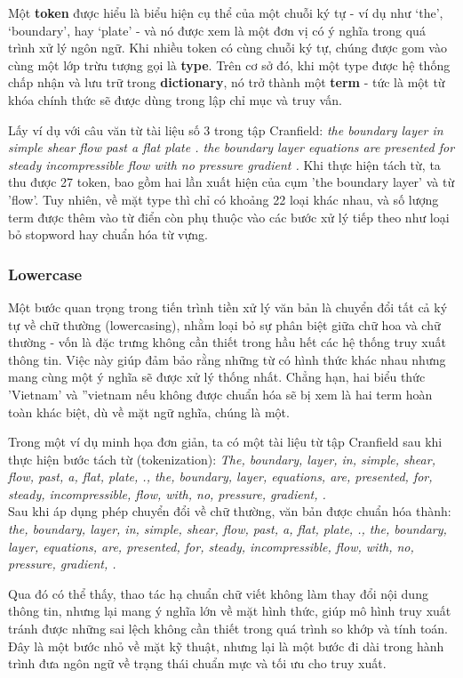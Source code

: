 Một \textbf{token} được hiểu là biểu hiện cụ thể của một chuỗi ký tự - ví dụ như `the', `boundary', hay `plate' - và nó được xem là một đơn vị có ý nghĩa trong quá trình xử lý ngôn ngữ. Khi nhiều token có cùng chuỗi ký tự, chúng được gom vào cùng một lớp trừu tượng gọi là \textbf{type}. Trên cơ sở đó, khi một type được hệ thống chấp nhận và lưu trữ trong \textbf{dictionary}, nó trở thành một \textbf{term} - tức là một từ khóa chính thức sẽ được dùng trong lập chỉ mục và truy vấn.

Lấy ví dụ với câu văn từ tài liệu số 3 trong tập Cranfield:
\textit{the boundary layer in simple shear flow past a flat plate . the boundary layer equations are presented for steady incompressible flow with no pressure gradient .}
Khi thực hiện tách từ, ta thu được 27 token, bao gồm hai lần xuất hiện của cụm 'the boundary layer' và từ 'flow'. Tuy nhiên, về mặt type thì chỉ có khoảng 22 loại khác nhau, và số lượng term được thêm vào từ điển còn phụ thuộc vào các bước xử lý tiếp theo như loại bỏ stopword hay chuẩn hóa từ vựng.

\subsubsection{Lowercase}
Một bước quan trọng trong tiến trình tiền xử lý văn bản là chuyển đổi tất cả ký tự về chữ thường (lowercasing), nhằm loại bỏ sự phân biệt giữa chữ hoa và chữ thường - vốn là đặc trưng không cần thiết trong hầu hết các hệ thống truy xuất thông tin. Việc này giúp đảm bảo rằng những từ có hình thức khác nhau nhưng mang cùng một ý nghĩa sẽ được xử lý thống nhất. Chẳng hạn, hai biểu thức 'Vietnam' và ''vietnam nếu không được chuẩn hóa sẽ bị xem là hai term hoàn toàn khác biệt, dù về mặt ngữ nghĩa, chúng là một.

Trong một ví dụ minh họa đơn giản, ta có một tài liệu từ tập Cranfield sau khi thực hiện bước tách từ (tokenization):
\textit{The, boundary, layer, in, simple, shear, flow, past, a, flat, plate, ., the, boundary, layer, equations, are, presented, for, steady, incompressible, flow, with, no, pressure, gradient, .}\\
Sau khi áp dụng phép chuyển đổi về chữ thường, văn bản được chuẩn hóa thành:
\textit{the, boundary, layer, in, simple, shear, flow, past, a, flat, plate, ., the, boundary, layer, equations, are, presented, for, steady, incompressible, flow, with, no, pressure, gradient, .}

Qua đó có thể thấy, thao tác hạ chuẩn chữ viết không làm thay đổi nội dung thông tin, nhưng lại mang ý nghĩa lớn về mặt hình thức, giúp mô hình truy xuất tránh được những sai lệch không cần thiết trong quá trình so khớp và tính toán. Đây là một bước nhỏ về mặt kỹ thuật, nhưng lại là một bước đi dài trong hành trình đưa ngôn ngữ về trạng thái chuẩn mực và tối ưu cho truy xuất.

